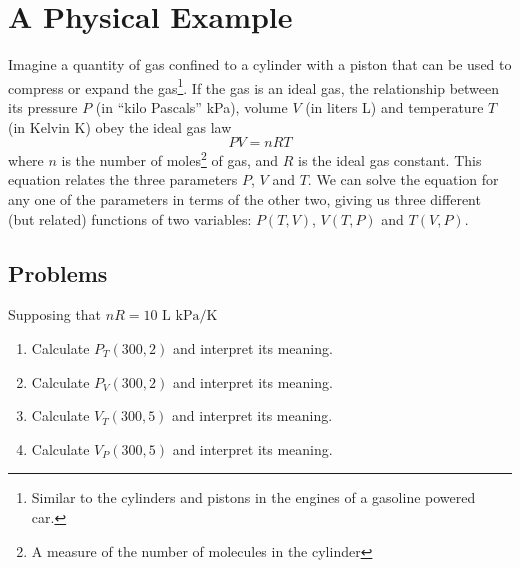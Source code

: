 \documentclass[13pt,letterpaper,fleqn]{article}
\begin{document}
\section*{A Physical Example}
Imagine a quantity of gas confined to a cylinder with a piston that can be used to compress or expand the gas\footnote{Similar to the cylinders and pistons in the engines of a gasoline powered car.}. If the gas is an ideal gas, the relationship between its pressure $P$ (in ``kilo Pascals'' kPa), volume $V$ (in liters L) and temperature $T$ (in Kelvin K) obey the ideal gas law
\begin{equation*}
 PV = nRT
\end{equation*}
where $n$ is the number of moles\footnote{A measure of the number of molecules in the cylinder} of gas, and $R$ is the ideal gas constant. This equation relates the three parameters $P$, $V$ and $T$. We can solve the equation for any one of the parameters in terms of the other two, giving us three different (but related) functions of two variables: $P(T,V)$, $V(T,P)$ and $T(V,P)$.
\subsection*{Problems}
Supposing that $nR = 10 \text{ L kPa/K}$
\begin{enumerate}
 \item Calculate $P_T(300, 2)$ and interpret its meaning.
 \item Calculate $P_V(300, 2)$ and interpret its meaning.
 \item Calculate $V_T(300, 5)$ and interpret its meaning.
 \item Calculate $V_P(300, 5)$ and interpret its meaning.
\end{enumerate}
\end{document}
